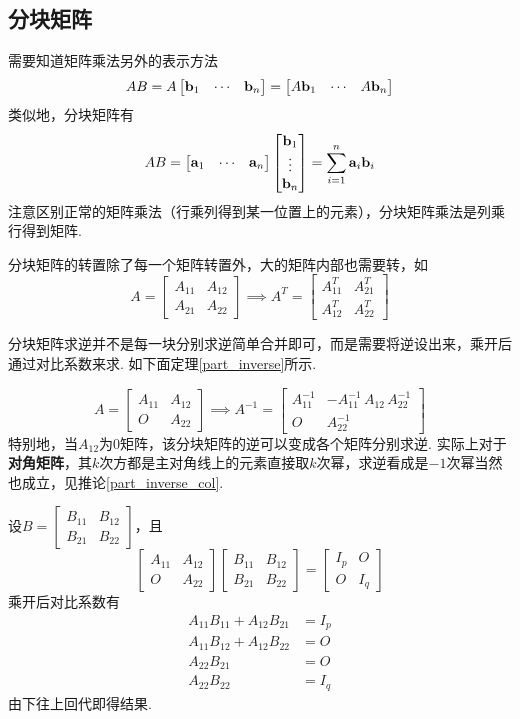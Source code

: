 \subsection{分块矩阵}
\par 需要知道矩阵乘法另外的表示方法
\[AB=A\begin{bmatrix}{\mathbf{b}_1}&\cdots&{\mathbf{b}_n}\end{bmatrix}=\begin{bmatrix}{A\mathbf{b}_1}&\cdots&{A\mathbf{b}_n}\end{bmatrix}\]
类似地，分块矩阵有
\[AB=\begin{bmatrix}{\mathbf{a}_1}&\cdots&{\mathbf{a}_n}\end{bmatrix}\begin{bmatrix}\mathbf{b}_1\\\vdots\\\mathbf{b}_n\end{bmatrix}=\sum_{i=1}^n\mathbf{a}_i\mathbf{b}_i\]
注意区别正常的矩阵乘法（行乘列得到某一位置上的元素），分块矩阵乘法是列乘行得到矩阵.
\par 分块矩阵的转置除了每一个矩阵转置外，大的矩阵内部也需要转，如
\[A=\begin{bmatrix}A_{11}&A_{12}\\A_{21}&A_{22}\end{bmatrix}\implies A^T=\begin{bmatrix}A_{11}^T&A_{21}^T\\A_{12}^T&A_{22}^T\end{bmatrix}\]
\par 分块矩阵求逆并不是每一块分别求逆简单合并即可，而是需要将逆设出来，乘开后通过对比系数来求. 如下面定理\ref{part_inverse}所示.
\begin{theorem}
\label{part_inverse}
\[A=\begin{bmatrix}A_{11}&A_{12}\\O&A_{22}\end{bmatrix}\implies A^{-1}=\begin{bmatrix}A_{11}^{-1}&-A_{11}^{-1}\,A_{12}\,A_{22}^{-1}\\O&A_{22}^{-1}\end{bmatrix}\]
特别地，当$A_{12}$为$0$矩阵，该分块矩阵的逆可以变成各个矩阵分别求逆. 实际上对于\textbf{对角矩阵}，其$k$次方都是主对角线上的元素直接取$k$次幂，求逆看成是$-1$次幂当然也成立，见推论\ref{part_inverse_col}.
\end{theorem}
\begin{analysis}
设$B=\begin{bmatrix}B_{11}&B_{12}\\B_{21}&B_{22}\end{bmatrix}$，且
\[\begin{bmatrix}A_{11}&A_{12}\\O&A_{22}\end{bmatrix}\begin{bmatrix}B_{11}&B_{12}\\B_{21}&B_{22}\end{bmatrix}=\begin{bmatrix}I_p&O\\O&I_q\end{bmatrix}\]
乘开后对比系数有
\[\begin{aligned}
A_{11}B_{11}+A_{12}B_{21}&=I_p\\
A_{11}B_{12}+A_{12}B_{22}&=O\\
A_{22}B_{21}&=O\\
A_{22}B_{22}&=I_q\end{aligned}\]
由下往上回代即得结果.
\end{analysis}
